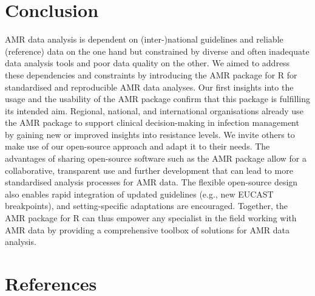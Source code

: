 \documentclass[
]{book}
\begin{document}
\hypertarget{conclusion-1}{%
\section{Conclusion}\label{conclusion-1}}

AMR data analysis is dependent on (inter-)national guidelines and reliable (reference) data on the one hand but constrained by diverse and often inadequate data analysis tools and poor data quality on the other. We aimed to address these dependencies and constraints by introducing the AMR package for R for standardised and reproducible AMR data analyses. Our first insights into the usage and the usability of the AMR package confirm that this package is fulfilling its intended aim. Regional, national, and international organisations already use the AMR package to support clinical decision-making in infection management by gaining new or improved insights into resistance levels. We invite others to make use of our open-source approach and adapt it to their needs. The advantages of sharing open-source software such as the AMR package allow for a collaborative, transparent use and further development that can lead to more standardised analysis processes for AMR data. The flexible open-source design also enables rapid integration of updated guidelines (e.g., new EUCAST breakpoints), and setting-specific adaptations are encouraged. Together, the AMR package for R can thus empower any specialist in the field working with AMR data by providing a comprehensive toolbox of solutions for AMR data analysis.

\hypertarget{references-2}{%
\section*{References}\label{references-2}}
\end{document}
